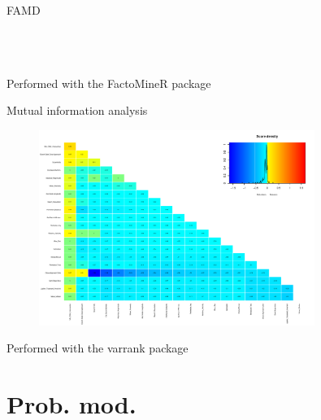 \documentclass{beamer}
\begin{document}
\begin{frame}{FAMD }
\begin{columns}
\begin{figure}[h]
\begin{center}
\label{FAMD_Quantitative variables}
\end{center}
\end{figure}
\end{columns}
\begin{center}
Performed with the FactoMineR package \cite{le2008factominer} 
\end{center}
\end{frame}

\begin{frame}{Mutual information analysis}
\begin{figure}
\begin{center}
\includegraphics[width=0.8\textwidth]{Pic/Mutual_information.pdf}
\label{Mutual_information}
\end{center}
\end{figure}
\begin{center}
Performed with the varrank package \cite{kratzer2018varrank} 
\end{center}
\end{frame}

\section{Prob. mod.}
\end{document}
